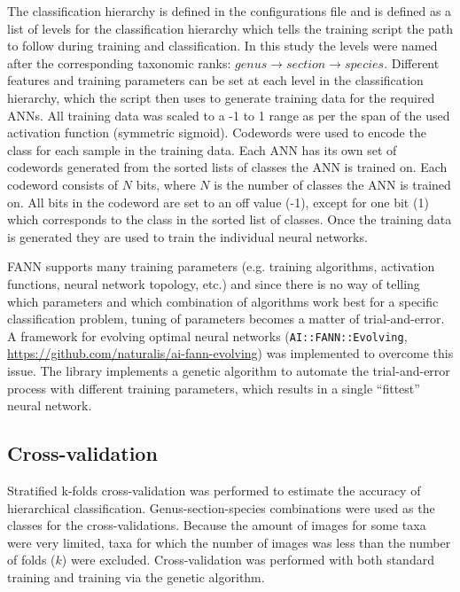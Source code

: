 \documentclass[twocolumn]{bmcart}
\begin{document}
The classification hierarchy is defined in the configurations file and is defined as a list of levels for the classification hierarchy which tells the training script the path to follow during training and classification. In this study the levels were named after the corresponding taxonomic ranks: $genus \rightarrow section \rightarrow species$. Different features and training parameters can be set at each level in the classification hierarchy, which the script then uses to generate training data for the required ANNs. All training data was scaled to a -1 to 1 range as per the span of the used activation function (symmetric sigmoid). Codewords were used to encode the class for each sample in the training data. Each ANN has its own set of codewords generated from the sorted lists of classes the ANN is trained on. Each codeword consists of $N$ bits, where $N$ is the number of classes the ANN is trained on. All bits in the codeword are set to an off value (-1), except for one bit (1) which corresponds to the class in the sorted list of classes. Once the training data is generated they are used to train the individual neural networks.

FANN supports many training parameters (e.g. training algorithms, activation functions, neural network topology, etc.) and since there is no way of telling which parameters and which combination of algorithms work best for a specific classification problem, tuning of parameters becomes a matter of trial-and-error. A framework for evolving optimal neural networks (\verb/AI::FANN::Evolving/, \url{https://github.com/naturalis/ai-fann-evolving}) was implemented to overcome this issue. The library implements a genetic algorithm to automate the trial-and-error process with different training parameters, which results in a single ``fittest'' neural network.

\subsection{Cross-validation}

Stratified k-folds cross-validation was performed to estimate the accuracy of hierarchical classification. Genus-section-species combinations were used as the classes for the cross-validations. Because the amount of images for some taxa were very limited, taxa for which the number of images was less than the number of folds ($k$) were excluded. Cross-validation was performed with both standard training and training via the genetic algorithm.
\end{document}
